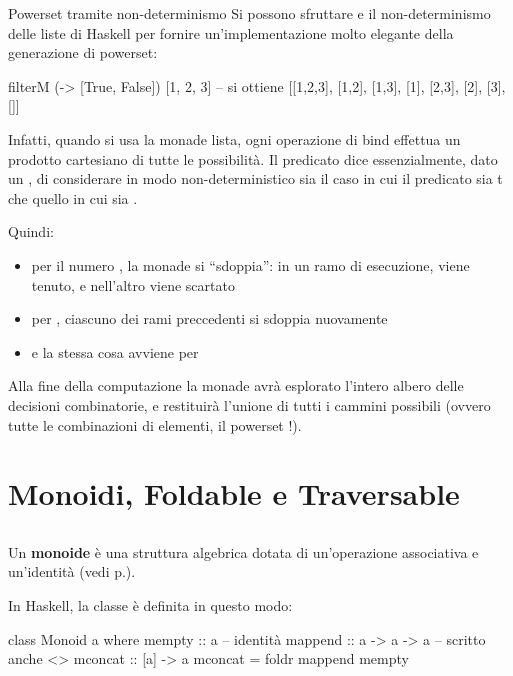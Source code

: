 \begin{gframe}{Powerset tramite non-determinismo}
    Si possono sfruttare  e il non-determinismo delle liste di Haskell per fornire un'implementazione molto elegante della generazione di powerset:
    \begin{haskellbox}{}
filterM (\x -> [True, False]) [1, 2, 3]
-- si ottiene [[1,2,3], [1,2], [1,3], [1], [2,3], [2], [3], []]
    \end{haskellbox}
    Infatti, quando si usa la monade lista, ogni operazione di bind effettua un prodotto cartesiano di tutte le possibilità. Il predicato  dice essenzialmente, dato un , di considerare in modo non-deterministico sia il caso in cui il predicato sia t che quello in cui sia .

    Quindi:
    \begin{itemize}
        \item per il numero , la monade si ``sdoppia'': in un ramo di esecuzione,  viene tenuto, e nell'altro viene scartato
        \item per , ciascuno dei rami preccedenti si sdoppia nuovamente
        \item e la stessa cosa avviene per 
    \end{itemize}

    Alla fine della computazione la monade avrà esplorato l'intero albero delle decisioni combinatorie, e restituirà l'unione di tutti i cammini possibili (ovvero tutte le combinazioni di elementi, il powerset !).

\end{gframe}

\section{Monoidi, Foldable e Traversable}

\subsection{}
Un \textbf{monoide} è una struttura algebrica dotata di un'operazione associativa e un'identità (vedi p.\pageref{monoid}).

In Haskell, la classe  è definita in questo modo:
\begin{haskellbox}{}
class Monoid a where
    mempty  :: a               -- identità
    mappend :: a -> a -> a     -- scritto anche <>
    mconcat :: [a] -> a
    mconcat = foldr mappend mempty
\end{haskellbox}

